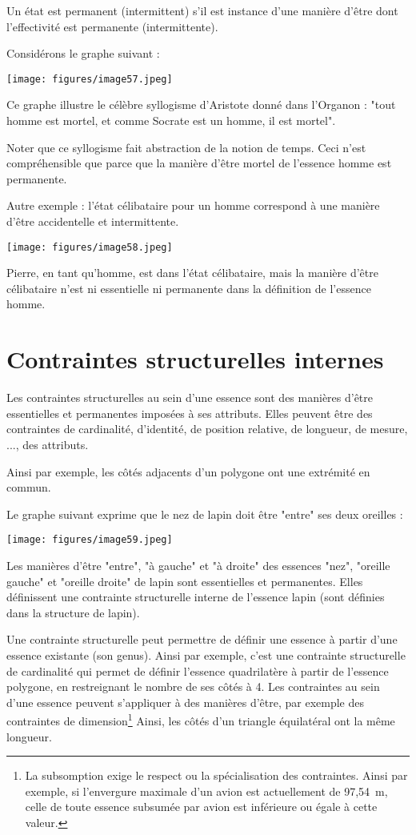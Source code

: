\documentclass[a4paper, 12pt, openright, french]{book}
\begin{document}
Un état est permanent (intermittent) s'il est instance
d'une manière d'être dont
l'effectivité est permanente (intermittente).

Considérons le graphe suivant :

\texttt{[image: figures/image57.jpeg]}

Ce graphe illustre le célèbre syllogisme d'Aristote
donné dans l'Organon : "tout homme est mortel, et comme
Socrate est un homme, il est mortel".

Noter que ce syllogisme fait abstraction de la notion de temps. Ceci
n'est compréhensible que parce que la manière
d'être mortel de l'essence homme est
permanente.

Autre exemple : l'état célibataire pour un homme
correspond à une manière d'être accidentelle et
intermittente.

\texttt{[image: figures/image58.jpeg]}

Pierre, en tant qu'homme, est dans
l'état célibataire, mais la manière
d'être célibataire n'est ni essentielle
ni permanente dans la définition de l'essence homme.

\raggedbottom
\chapter{Contraintes structurelles internes}

Les contraintes structurelles au sein d'une essence sont
des manières d'être essentielles et permanentes imposées
à ses attributs. Elles peuvent être des contraintes de cardinalité,
d'identité, de position relative, de longueur, de
mesure, ..., des attributs.

Ainsi par exemple, les côtés adjacents d'un polygone ont
une extrémité en commun.

Le graphe suivant exprime que le nez de lapin doit être "entre" ses deux
oreilles :

\texttt{[image: figures/image59.jpeg]}

Les manières d'être "entre", "à gauche" et "à droite"
des essences "nez", "oreille gauche" et "oreille droite" de lapin sont
essentielles et permanentes. Elles définissent une contrainte
structurelle interne de l'essence lapin (sont définies
dans la structure de lapin).

Une contrainte structurelle peut permettre de définir une essence à
partir d'une essence existante (son genus). Ainsi par
exemple, c'est une contrainte structurelle de
cardinalité qui permet de définir l'essence quadrilatère
à partir de l'essence polygone, en restreignant le
nombre de ses côtés à 4. Les contraintes au sein d'une
essence peuvent s'appliquer à des manières
d'être, par exemple des contraintes de
dimension\footnote{La subsomption exige le respect ou la spécialisation
	des contraintes. Ainsi par exemple, si l'envergure
	maximale d'un avion est actuellement de 97,54~m, celle
	de toute essence subsumée par avion est inférieure ou égale à cette
	valeur.} Ainsi, les côtés d'un
triangle équilatéral ont la même longueur.
\end{document}
